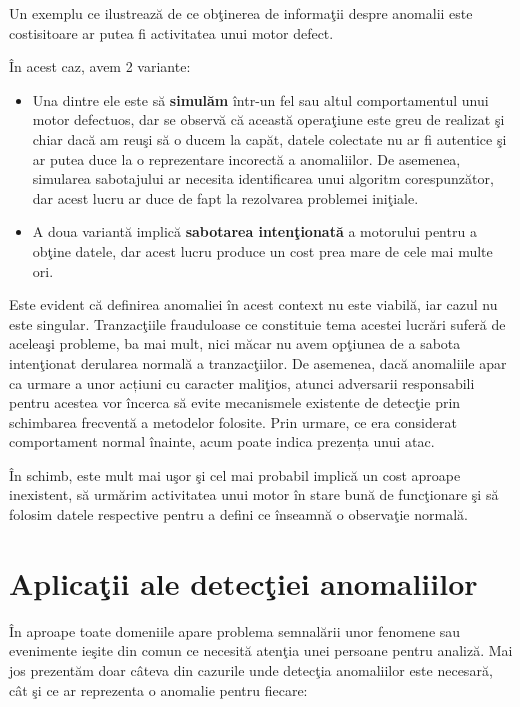 Un exemplu ce ilustrează de ce obţinerea de informaţii
despre anomalii este costisitoare ar putea fi activitatea unui
motor defect.

În acest caz, avem 2 variante:
\begin{itemize}
    \item Una dintre ele 
        este să \textbf{simulăm} 
        într-un fel sau altul comportamentul unui motor defectuos, dar 
        se observă că această operaţiune este greu de realizat şi chiar dacă am reuşi 
        să o ducem la capăt, datele colectate nu ar fi autentice şi ar putea duce 
        la o reprezentare incorectă a anomaliilor. 
        De asemenea, simularea
        sabotajului ar necesita identificarea unui algoritm corespunzător, 
        dar acest lucru ar duce de fapt la rezolvarea problemei iniţiale.

    \item A doua variantă implică \textbf{sabotarea 
        intenţionată} a motorului pentru a obţine datele, dar acest lucru produce un 
        cost prea mare de cele mai multe ori. 
\end{itemize}

Este evident că definirea anomaliei în acest context nu este viabilă, iar 
cazul nu este singular. Tranzacţiile frauduloase ce constituie tema acestei lucrări 
suferă de aceleaşi probleme, ba mai mult, nici măcar nu avem opţiunea de a 
sabota intenţionat derularea normală a tranzacţiilor. De asemenea,
dacă anomaliile apar ca urmare a unor acțiuni cu caracter maliţios,
atunci adversarii responsabili pentru acestea vor încerca să 
evite mecanismele existente de detecţie prin schimbarea 
frecventă a metodelor folosite. Prin urmare, ce era considerat
comportament normal înainte, acum poate indica prezența unui 
atac.


În schimb, 
este mult mai uşor şi cel mai probabil 
implică un cost aproape inexistent, să urmărim activitatea unui motor 
în stare bună de funcţionare şi să folosim datele respective pentru a 
defini ce înseamnă o observaţie normală.

\section{Aplicaţii ale detecţiei anomaliilor}

În aproape toate domeniile apare problema semnalării unor fenomene sau evenimente 
ieşite din comun ce necesită atenţia unei persoane pentru analiză. Mai jos prezentăm
doar câteva din cazurile unde detecţia anomaliilor este necesară, cât şi ce ar 
reprezenta o anomalie pentru fiecare:

